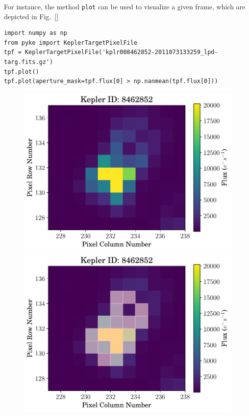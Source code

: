 \documentclass{article}
\begin{document}
        For instance, the method \texttt{plot} can be used to visualize a
        given frame, which are depicted in Fig.~\ref{}
\begin{verbatim}
import numpy as np
from pyke import KeplerTargetPixelFile
tpf = KeplerTargetPixelFile('kplr008462852-2011073133259_lpd-targ.fits.gz')
tpf.plot()
tpf.plot(aperture_mask=tpf.flux[0] > np.nanmean(tpf.flux[0]))
\end{verbatim}

        \begin{figure}[!htb]
            \includegraphics[scale=.4]{figs/tpf-plot.pdf}
            \includegraphics[scale=.4]{figs/tpf-plot-aperture.pdf}
            \caption{}
            \label{fig:plot-method}
        \end{figure}
\end{document}
